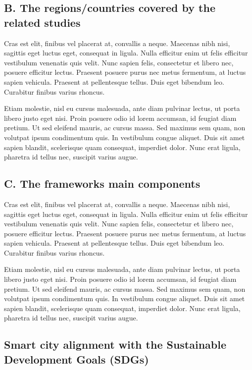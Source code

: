 \documentclass[a4paper,fleqn,spanish]{cas-dc}
\begin{document}
\subsection{B. The regions/countries covered by the related studies}\label{regiones}

Cras est elit, finibus vel placerat at, convallis a neque. Maecenas nibh nisi,
sagittis eget luctus eget, consequat in ligula. Nulla efficitur enim ut felis
efficitur vestibulum venenatis quis velit. Nunc sapien felis, consectetur et
libero nec, posuere efficitur lectus. Praesent posuere purus nec metus
fermentum, at luctus sapien vehicula. Praesent at pellentesque tellus. Duis eget
bibendum leo. Curabitur finibus varius rhoncus.

Etiam molestie, nisl eu cursus malesuada, ante diam pulvinar lectus, ut porta
libero justo eget nisi. Proin posuere odio id lorem accumsan, id feugiat diam
pretium. Ut sed eleifend mauris, ac cursus massa. Sed maximus sem quam, non
volutpat ipsum condimentum quis. In vestibulum congue aliquet. Duis sit amet
sapien blandit, scelerisque quam consequat, imperdiet dolor. Nunc erat ligula,
pharetra id tellus nec, suscipit varius augue.


\subsection{C. The frameworks main components}\label{componentes}

Cras est elit, finibus vel placerat at, convallis a neque. Maecenas nibh nisi,
sagittis eget luctus eget, consequat in ligula. Nulla efficitur enim ut felis
efficitur vestibulum venenatis quis velit. Nunc sapien felis, consectetur et
libero nec, posuere efficitur lectus. Praesent posuere purus nec metus
fermentum, at luctus sapien vehicula. Praesent at pellentesque tellus. Duis eget
bibendum leo. Curabitur finibus varius rhoncus.

Etiam molestie, nisl eu cursus malesuada, ante diam pulvinar lectus, ut porta
libero justo eget nisi. Proin posuere odio id lorem accumsan, id feugiat diam
pretium. Ut sed eleifend mauris, ac cursus massa. Sed maximus sem quam, non
volutpat ipsum condimentum quis. In vestibulum congue aliquet. Duis sit amet
sapien blandit, scelerisque quam consequat, imperdiet dolor. Nunc erat ligula,
pharetra id tellus nec, suscipit varius augue.


\subsection{Smart city alignment with the Sustainable Development Goals (SDGs)}\label{sustentabilidad}
\end{document}
